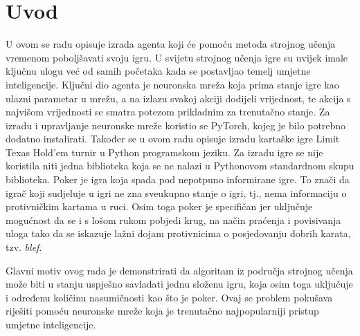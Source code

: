 \section{Uvod}
U ovom se radu opisuje izrada agenta koji će pomoću metoda strojnog učenja vremenom poboljšavati svoju igru. U svijetu strojnog učenja igre su uvijek imale ključnu ulogu već od samih početaka kada se postavljao temelj umjetne inteligencije. Ključni dio agenta je neuronska mreža koja prima stanje igre kao ulazni parametar u mrežu, a na izlazu svakoj akciji dodijeli vrijednost, te akcija s najvišom vrijednosti se smatra potezom prikladnim za trenutačno stanje. Za izradu i upravljanje neuronske mreže koristio se PyTorch, kojeg je bilo potrebno dodatno instalirati. Također se u ovom radu opisuje izradu kartaške igre Limit Texas Hold'em turnir u Python programskom jeziku. Za izradu igre se nije koristila niti jedna biblioteka koja se ne nalazi u Pythonovom standardnom skupu biblioteka. Poker je igra koja spada pod nepotpuno informirane igre. To znači da igrač koji sudjeluje u igri ne zna sveukupno stanje o igri, tj., nema informaciju o protivničkim kartama u ruci. Osim toga poker je specifičan jer uključuje mogućnost da se i s lošom rukom pobjedi krug, na način praćenja i povisivanja uloga tako da se iskazuje lažni dojam protivnicima o posjedovanju dobrih karata, tzv. \emph{blef}. 

Glavni motiv ovog rada je demonstrirati da algoritam iz područja strojnog učenja može biti u stanju uspješno savladati jednu složenu igru, koja osim toga uključuje i određenu količinu nasumičnosti kao što je poker. Ovaj se problem pokušava riješiti pomoću neuronske mreže koja je trenutačno najpopularniji pristup umjetne inteligencije. 